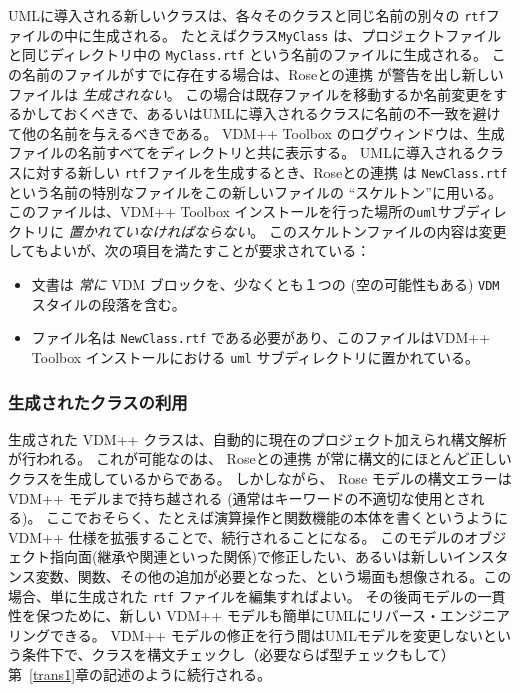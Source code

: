 \documentclass[\pformat,12pt]{jarticle}
\newcommand{\vdmpp}{VDM++}
\newcommand{\ToolboxName}{\vdmpp{} Toolbox}
\newcommand{\link}{Roseとの連携}
\begin{document}
UMLに導入される新しいクラスは、各々そのクラスと同じ名前の別々の {\tt  rtf}ファイルの中に生成される。
たとえばクラス{\tt MyClass} は、プロジェクトファイルと同じディレクトリ中の {\tt  MyClass.rtf} という名前のファイルに生成される。
この名前のファイルがすでに存在する場合は、\link{} が警告を出し新しいファイルは {\em 生成されない}。
この場合は既存ファイルを移動するか名前変更をするかしておくべきで、あるいはUMLに導入されるクラスに名前の不一致を避けて他の名前を与えるべきである。
\vdmpp{} Toolbox のログウィンドウは、生成ファイルの名前すべてをディレクトリと共に表示する。
UMLに導入されるクラスに対する新しい {\tt rtf}ファイルを生成するとき、\link{} は {\tt NewClass.rtf} という名前の特別なファイルをこの新しいファイルの ``スケルトン''に用いる。
このファイルは、\ToolboxName{} インストールを行った場所の{\tt uml}サブディレクトリに {\em 置かれていなければならない}。
 このスケルトンファイルの内容は変更してもよいが、次の項目を満たすことが要求されている：

\begin{itemize}
\item 文書は {\em 常に}  VDM ブロックを、少なくとも１つの (空の可能性もある)  {\tt VDM}スタイルの段落を含む。
\item ファイル名は {\tt NewClass.rtf} である必要があり、このファイルは\ToolboxName{} インストールにおける {\tt uml} サブディレクトリに置かれている。
\end{itemize}


\subsubsection*{生成されたクラスの利用}

生成された \vdmpp{} クラスは、自動的に現在のプロジェクト加えられ構文解析が行われる。
これが可能なのは、 \link{} が常に構文的にほとんど正しいクラスを生成しているからである。
しかしながら、 Rose モデルの構文エラーは VDM++ モデルまで持ち越される (通常はキーワードの不適切な使用とされる)。
ここでおそらく、たとえば演算操作と関数機能の本体を書くというように\vdmpp{} 仕様を拡張することで、続行されることになる。
 このモデルのオブジェクト指向面(継承や関連といった関係)で修正したい、あるいは新しいインスタンス変数、関数、その他の追加が必要となった、という場面も想像される。この場合、単に生成された {\tt rtf} ファイルを編集すればよい。
その後両モデルの一貫性を保つために、新しい \vdmpp{} モデルも簡単にUMLにリバース・エンジニアリングできる。
\vdmpp{} モデルの修正を行う間はUMLモデルを変更しないという条件下で、クラスを構文チェックし（必要ならば型チェックもして）第~\ref{trans1}章の記述のように続行される。
\end{document}
